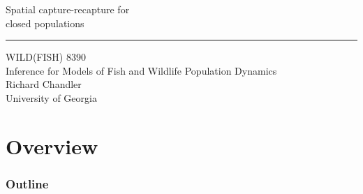 \documentclass[color=usenames,dvipsnames]{beamer}\usepackage[]{graphicx}\usepackage[]{xcolor}
\begin{document}
    



\begin{frame}[plain]
  \LARGE
  \centering
  {
    \LARGE Spatial capture-recapture %
    for \\ closed populations \\
  }
  {\color{default} \rule{\textwidth}{0.1pt} }
  \vfill
  \large
  WILD(FISH) 8390 \\
  Inference for Models of Fish and Wildlife Population Dynamics \\
  \vfill
  \large
  Richard Chandler \\
  University of Georgia \\
\end{frame}






\section{Overview}



\begin{frame}[plain]
  \frametitle{Outline}
  \Large
\end{frame}
\end{document}
